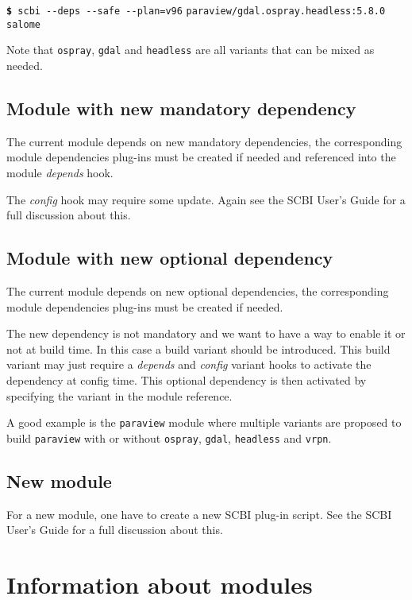 \documentclass[a4paper,12pt,twoside]{article}
\newcommand{\code}[1]{\texttt{#1}}
\renewcommand{\emph}[1]{\textit{#1}}
\newcommand{\cmd}[1]{\tabto{1cm}\hspace{0.5cm}\texttt{\textbf{\$} #1}}
\newcommand{\cmdc}[1]{\tabto{1cm}\hspace{1.5cm}\texttt{#1}}
\newcommand{\ddash}{-{}-}
\let\stdsection\section
\renewcommand\section{\newpage\stdsection}
\begin{document}
\cmd{scbi \ddash{}deps \ddash{}safe \ddash{}plan=v96}
\cmdc{paraview/gdal.ospray.headless:5.8.0 salome}

Note that \code{ospray}, \code{gdal} and \code{headless} are all variants that can be mixed as needed.

\subsection{Module with new mandatory dependency}

The current module depends on new mandatory dependencies, the corresponding module dependencies plug-ins must be created if needed and referenced into the module \emph{depends} hook.

The \emph{config} hook may require some update. Again see the SCBI User's Guide for a full discussion about this.

\subsection{Module with new optional dependency}

The current module depends on new optional dependencies, the corresponding module dependencies plug-ins must be created if needed.

The new dependency is not mandatory and we want to have a way to enable it or not at build time. In this case a build variant should be introduced. This build variant may just require a \emph{depends} and \emph{config} variant hooks to activate the dependency at config time. This optional dependency is then activated by specifying the variant in the module reference.

A good example is the \code{paraview} module where multiple variants are proposed to build \code{paraview} with or without \code{ospray}, \code{gdal}, \code{headless} and \code{vrpn}.

\subsection{New module}

For a new module, one have to create a new SCBI plug-in script. See the SCBI User's Guide for a full discussion about this.


\section{Information about modules}
\label{information}
\end{document}
